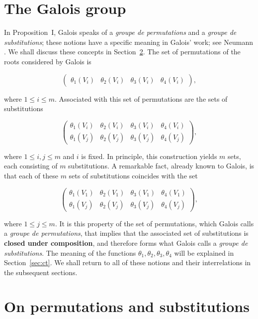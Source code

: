 \documentclass[a4paper,11pt]{article}
\begin{document}
 
\section{The Galois group}

In Proposition~I, Galois speaks of a \textit{groupe de permutations} and a \textit{groupe de substitutions}; these notions have a specific meaning in Galois' work; see Neumann \cite[pp.~20--23]{neumann}. We shall discuss these concepts in Section~\ref{sec:ps}. The set of permutations of the roots considered by Galois is

\[
\left(
\begin{array}{cccc}
	\theta_1(V_i)&\theta_2(V_i)&\theta_3(V_i)&\theta_4(V_i)
\end{array}
\right),
\]

where \(1 \le i \le m\). Associated with this set of permutations are the sets of substitutions

\[
\left(
\begin{array}{cccc}
	\theta_1(V_i)&\theta_2(V_i)&\theta_3(V_i)&\theta_4(V_i)\\
	\theta_1(V_j)&\theta_2(V_j)&\theta_3(V_j)&\theta_4(V_j)
\end{array}
\right),
\]

where \(1 \le i,j \le m\) and \(i\) is fixed. In principle, this construction yields \(m\) sets, each consisting of \(m\) substitutions. A remarkable fact, already known to Galois, is that each of these \(m\) sets of substitutions coincides with the set

\[
\left(
\begin{array}{cccc}
	\theta_1(V_1)&\theta_2(V_1)&\theta_3(V_1)&\theta_4(V_1)\\
	\theta_1(V_j)&\theta_2(V_j)&\theta_3(V_j)&\theta_4(V_j)
\end{array}
\right),
\]

where \(1 \le j \le m\). It is this property of the set of permutations, which Galois calls a \textit{groupe de permutations}, that implies that the associated set of substitutions is \textbf{closed under composition}, and therefore forms what Galois calls a \textit{groupe de substitutions}. The meaning of the functions \(\theta_1,\theta_2,\theta_3,\theta_4\) will be explained in Section~\ref{sec:ct}. We shall return to all of these notions and their interrelations in the subsequent sections.


\section{On permutations and substitutions}
\label{sec:ps}
\end{document}
